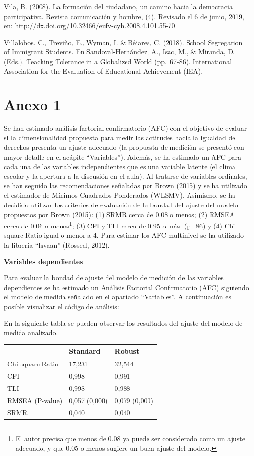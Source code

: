 \documentclass[12pt,twoside]{templates/facsothesis}
\begin{document}
Vila, B. (2008). La formación del ciudadano, un camino hacia la democracia participativa. Revista comunicación y hombre, (4). Revisado el 6 de junio, 2019, en: \url{http://dx.doi.org/10.32466/eufv-cyh.2008.4.101.55-70}

Villalobos, C., Treviño, E., Wyman, I. \& Béjares, C. (2018). School Segregation of Immigrant Students. En Sandoval-Hernández, A., Isac, M., \& Miranda, D. (Eds.). Teaching Tolerance in a Globalized World (pp.~67-86). International Association for the Evaluation of Educational Achievement (IEA).

\hypertarget{anexo-1}{%
\chapter*{Anexo 1}\label{anexo-1}}

Se han estimado análisis factorial confirmatorio (AFC) con el objetivo de evaluar si la dimensionalidad propuesta para medir las actitudes hacia la igualdad de derechos presenta un ajuste adecuado (la propuesta de medición se presentó con mayor detalle en el acápite ``Variables''). Además, se ha estimado un AFC para cada una de las variables independientes que es una variable latente (el clima escolar y la apertura a la discusión en el aula). Al tratarse de variables ordinales, se han seguido las recomendaciones señaladas por Brown (2015) y se ha utilizado el estimador de Mínimos Cuadrados Ponderados (WLSMV). Asimismo, se ha decidido utilizar los criterios de evaluación de la bondad del ajuste del modelo propuestos por Brown (2015): (1) SRMR cerca de 0.08 o menos; (2) RMSEA cerca de 0.06 o menos\footnote{El autor precisa que menos de 0.08 ya puede ser considerado como un ajuste adecuado, y que 0.05 o menos sugiere un buen ajuste del modelo.}; (3) CFI y TLI cerca de 0.95 o más. (p.~86) y (4) Chi-square Ratio igual o menor a 4. Para estimar los AFC multinivel se ha utilizado la librería ``lavaan'' (Rosseel, 2012).

\textbf{Variables dependientes}

Para evaluar la bondad de ajuste del modelo de medición de las variables dependientes se ha estimado un Análisis Factorial Confirmatorio (AFC) siguiendo el modelo de medida señalado en el apartado ``Variables''. A continuación es posible visualizar el código de análisis:

En la siguiente tabla se pueden observar los resultados del ajuste del modelo de medida analizado.

\begin{longtable}[]{@{}lll@{}}
\toprule
& Standard & Robust \\
\midrule
\endhead
Chi-square Ratio & 17,231 & 32,544 \\
CFI & 0,998 & 0,991 \\
TLI & 0,998 & 0,988 \\
RMSEA (P-value) & 0,057 (0,000) & 0,079 (0,000) \\
SRMR & 0,040 & 0,040 \\
\bottomrule
\end{longtable}
\end{document}
